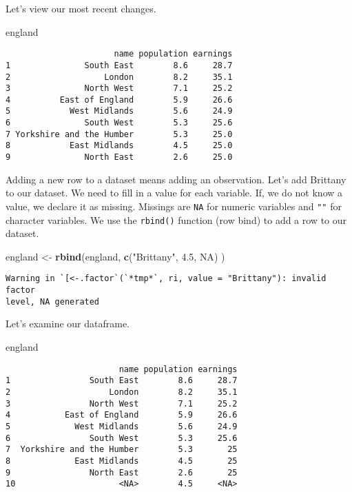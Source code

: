 \documentclass[]{article}
\newenvironment{Shaded}{\begin{snugshade}}{\end{snugshade}}
\newcommand{\FloatTok}[1]{\textcolor[rgb]{0.00,0.00,0.81}{#1}}
\newcommand{\KeywordTok}[1]{\textcolor[rgb]{0.13,0.29,0.53}{\textbf{#1}}}
\newcommand{\NormalTok}[1]{#1}
\newcommand{\OtherTok}[1]{\textcolor[rgb]{0.56,0.35,0.01}{#1}}
\newcommand{\StringTok}[1]{\textcolor[rgb]{0.31,0.60,0.02}{#1}}
\begin{document}
Let's view our most recent changes.

\begin{Shaded}
\begin{Highlighting}[]
\NormalTok{england}
\end{Highlighting}
\end{Shaded}

\begin{verbatim}
                      name population earnings
1               South East        8.6     28.7
2                   London        8.2     35.1
3               North West        7.1     25.2
4          East of England        5.9     26.6
5            West Midlands        5.6     24.9
6               South West        5.3     25.6
7 Yorkshire and the Humber        5.3     25.0
8            East Midlands        4.5     25.0
9               North East        2.6     25.0
\end{verbatim}

Adding a new row to a dataset means adding an observation. Let's add Brittany to our dataset. We need to fill in a value for each variable. If, we do not know a value, we declare it as missing. Missings are \texttt{NA} for numeric variables and \texttt{""} for character variables. We use the \texttt{rbind()} function (row bind) to add a row to our dataset.

\begin{Shaded}
\begin{Highlighting}[]
\NormalTok{england <-}\StringTok{ }\KeywordTok{rbind}\NormalTok{(england,  }\KeywordTok{c}\NormalTok{(}\StringTok{"Brittany"}\NormalTok{, }\FloatTok{4.5}\NormalTok{, }\OtherTok{NA}\NormalTok{) )}
\end{Highlighting}
\end{Shaded}

\begin{verbatim}
Warning in `[<-.factor`(`*tmp*`, ri, value = "Brittany"): invalid factor
level, NA generated
\end{verbatim}

Let's examine our dataframe.

\begin{Shaded}
\begin{Highlighting}[]
\NormalTok{england}
\end{Highlighting}
\end{Shaded}

\begin{verbatim}
                       name population earnings
1                South East        8.6     28.7
2                    London        8.2     35.1
3                North West        7.1     25.2
4           East of England        5.9     26.6
5             West Midlands        5.6     24.9
6                South West        5.3     25.6
7  Yorkshire and the Humber        5.3       25
8             East Midlands        4.5       25
9                North East        2.6       25
10                     <NA>        4.5     <NA>
\end{verbatim}
\end{document}
